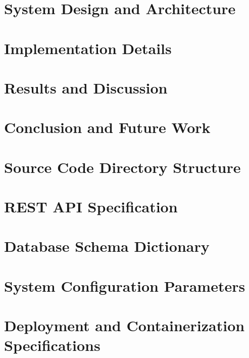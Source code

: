 \documentclass[a4paper, 12pt]{report}
\begin{document}
\chapter{System Design and Architecture}


\chapter{Implementation Details}


\chapter{Results and Discussion}


\chapter{Conclusion and Future Work}


\newpage
{}
{}
\printbibliography

\newpage
\appendix
\chapter{Source Code Directory Structure}


\chapter{REST API Specification}


\chapter{Database Schema Dictionary}


\chapter{System Configuration Parameters}


\chapter{Deployment and Containerization Specifications}

\end{document}
